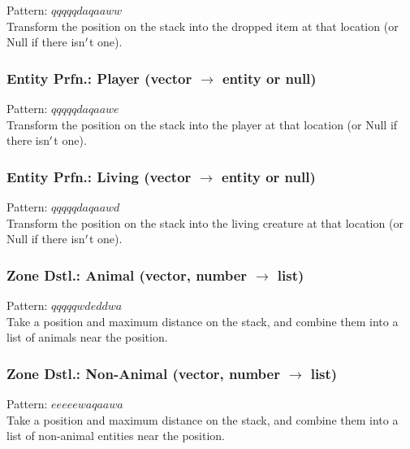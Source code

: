 \documentclass[12pt]{article}
\begin{document}
    Pattern: $qqqqqdaqaaww$\\
      Transform the position on the stack into the dropped item at that location (or Null if there isn$\rq$t one).\\


  \label{sec: patterns/entities@hexcasting:get_entity/player}
\subsubsection*{Entity Prfn.: Player (vector $\rightarrow$ entity or null)}

    Pattern: $qqqqqdaqaawe$\\
      Transform the position on the stack into the player at that location (or Null if there isn$\rq$t one).\\


  \label{sec: patterns/entities@hexcasting:get_entity/living}
\subsubsection*{Entity Prfn.: Living (vector $\rightarrow$ entity or null)}

    Pattern: $qqqqqdaqaawd$\\
      Transform the position on the stack into the living creature at that location (or Null if there isn$\rq$t one).\\


  \label{sec: patterns/entities@hexcasting:zone_entity/animal}
\subsubsection*{Zone Dstl.: Animal (vector, number $\rightarrow$ list)}

    Pattern: $qqqqqwdeddwa$\\
      Take a position and maximum distance on the stack, and combine them into a list of animals near the position.\\


  \label{sec: patterns/entities@hexcasting:zone_entity/not_animal}
\subsubsection*{Zone Dstl.: Non-Animal (vector, number $\rightarrow$ list)}

    Pattern: $eeeeewaqaawa$\\
      Take a position and maximum distance on the stack, and combine them into a list of non-animal entities near the position.\\
\end{document}
